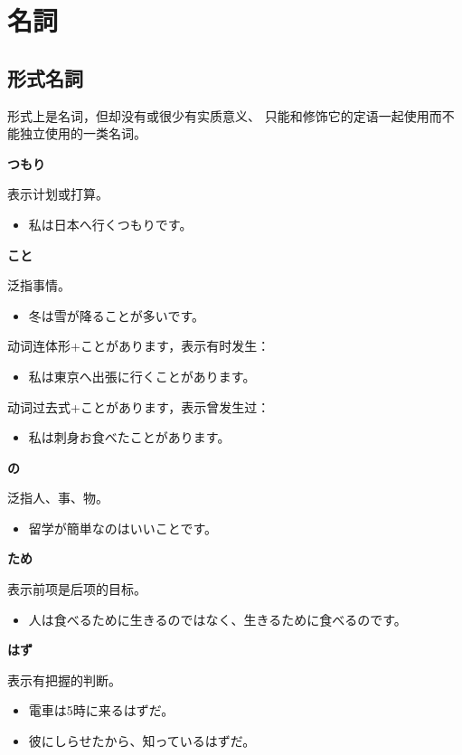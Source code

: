 \section{名詞}%

\subsection{形式名詞}%

形式上是名词，但却没有或很少有实质意义、
只能和修饰它的定语一起使用而不能独立使用的一类名词。

{\bf
\noindent つもり
}

表示计划或打算。
\begin{itemize}
  \item 私は日本へ行くつもりです。
\end{itemize}

{\bf
\noindent こと
}

泛指事情。
\begin{itemize}
  \item 冬は雪が降ることが多いです。
\end{itemize}

动词连体形+ことがあります，表示有时发生：
\begin{itemize}
  \item 私は東京へ出張に行くことがあります。
\end{itemize}

动词过去式+ことがあります，表示曾发生过：
\begin{itemize}
  \item 私は刺身お食べたことがあります。
\end{itemize}

{\bf
\noindent の
}

泛指人、事、物。
\begin{itemize}
  \item 留学が簡単なのはいいことです。
\end{itemize}

{\bf
\noindent ため
}

表示前项是后项的目标。
\begin{itemize}
  \item 人は食べるために生きるのではなく、生きるために食べるのです。
\end{itemize}

{\bf
\noindent はず
}

表示有把握的判断。
\begin{itemize}
  \item 電車は5時に来るはずだ。
  \item 彼にしらせたから、知っているはずだ。
\end{itemize}


